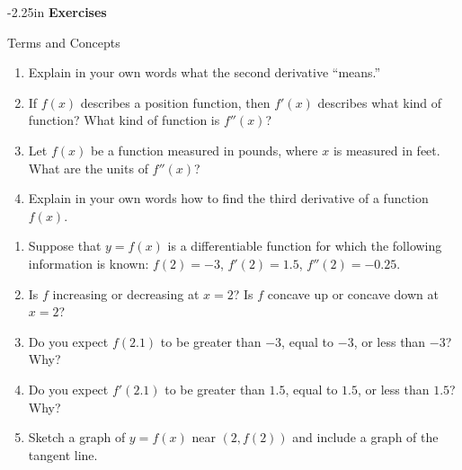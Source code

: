 \begin{adjustwidth*}{}{-2.25in}
\textbf{{\large Exercises}}
\setlength{\columnsep}{25pt}
\begin{multicols*}{2}
\noindent Terms and Concepts \small
\begin{enumerate}[1)]
\item Explain in  your own words what the second derivative ``means.''
\item If $f(x)$ describes a position function, then $f'(x)$ describes what kind of function? What kind of function is $f''(x)$?
\item Let $f(x)$ be a function measured in pounds, where $x$ is measured in feet. What are the units of $f''(x)$?
\item Explain in your own words how to find the third derivative of a function $f(x)$.
\end{enumerate} 

 \small


\begin{enumerate}[1),resume]
\item Suppose that $y = f(x)$ is a differentiable function for which the following information is known:  $f(2) = -3$, $f'(2) = 1.5$, $f''(2) = -0.25$.
\ba
	\item Is $f$ increasing or decreasing at $x = 2$?  Is $f$ concave up or concave down at $x = 2$?
	\item Do you expect $f(2.1)$ to be greater than $-3$, equal to $-3$, or less than $-3$?  Why?
	\item Do you expect $f'(2.1)$ to be greater than $1.5$, equal to $1.5$, or less than $1.5$?  Why?
	\item Sketch a graph of $y = f(x)$ near $(2,f(2))$ and include a graph of the tangent line.  
\ea


\end{enumerate}
\end{multicols*}
\end{adjustwidth*}
